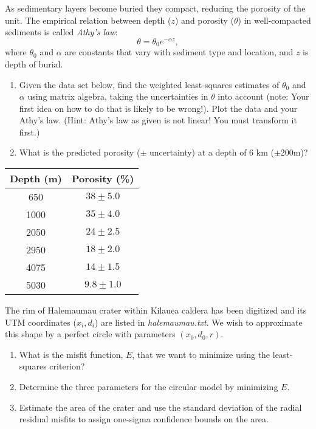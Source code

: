 \begin{problem}
As sedimentary layers become buried they compact, reducing the porosity of the unit.
The empirical relation between depth ($z$) and porosity ($\theta$) in well-compacted sediments is called \emph{Athy's law}:
$$
\theta = \theta_0 e^{-\alpha z},
$$
where $\theta_0$ and $\alpha$ are constants that vary with sediment type and location, and $z$ is depth of burial.  
\begin{enumerate}[label=\alph*)]
\item	Given the data set below, find the weighted least-squares estimates of $\theta_0$ and $\alpha$ using matrix algebra,
taking the uncertainties in $\theta$ into account (note: Your first idea on how to do that is likely to be wrong!).
Plot the data and your Athy's law.  (Hint:  Athy's law as given
is not linear!  You must transform it first.)
\item	What is the predicted porosity ($\pm$ uncertainty) at a depth of 6 km ($\pm 200$m)?
\end{enumerate}
\begin{table}[H]
\centering
\begin{tabular}{|c|c|} \hline
\bf{Depth} (m) &	\bf{Porosity (\%)} \\ \hline
650	& $38 \pm 5.0$ \\ \hline
1000	& $35 \pm 4.0$ \\ \hline
2050	& $24 \pm 2.5$ \\ \hline
2950	& $18 \pm 2.0$ \\ \hline
4075	& $14 \pm 1.5$ \\ \hline
5030	& $9.8 \pm 1.0$ \\ \hline
\end{tabular}
\end{table}
\end{problem}

\begin{problem}
The rim of Halemaumau crater within Kilauea caldera has been digitized and its UTM coordinates ($x_i, d_i$) are
listed in \emph{halemaumau.txt}.  We wish to approximate this shape by a perfect circle with parameters
$(x_0, d_0, r)$.
\begin{enumerate}[label=\alph*)]
	\item What is the misfit function, $E$, that we want to minimize using the least-squares criterion?
	\item Determine the three parameters for the circular model by minimizing $E$.
	\item Estimate the area of the crater and use the standard deviation of the radial residual misfits to assign
	  one-sigma confidence bounds on the area.
\end{enumerate}
\end{problem}

